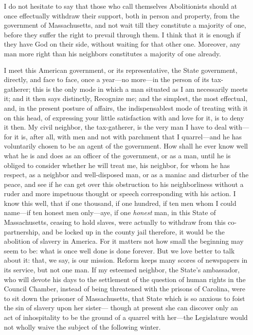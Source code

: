 \documentclass[letterpaper,12pt]{article}
\begin{document}
I do not hesitate to say that those who call themselves Abolitionists should at
once effectually withdraw their support, both in person and property, from the
government of Massachusetts, and not wait till they constitute a majority of
one, before they suffer the right to prevail through them. I think that it is
enough if they have God on their side, without waiting for that other one.
Moreover, any man more right than his neighbors constitutes a majority of one
already.

I meet this American government, or its representative, the State government,
directly, and face to face, once a year---no more---in the person of its
tax-gatherer; this is the only mode in which a man situated as I am necessarily
meets it; and it then says distinctly, Recognize me; and the simplest, the most
effectual, and, in the present posture of affairs, the indispensablest mode of
treating with it on this head, of expressing your little satisfaction with and
love for it, is to deny it then. My civil neighbor, the tax-gatherer, is the
very man I have to deal with---for it is, after all, with men and not with
parchment that I quarrel---and he has voluntarily chosen to be an agent of the
government. How shall he ever know well what he is and does as an officer of the
government, or as a man, until he is obliged to consider whether he will treat
me, his neighbor, for whom he has respect, as a neighbor and well-disposed man,
or as a maniac and disturber of the peace, and see if he can get over this
obstruction to his neighborliness without a ruder and more impetuous thought or
speech corresponding with his action. I know this well, that if one thousand, if
one hundred, if ten men whom I could name---if ten honest men only---aye, if one
\emph{honest} man, in this State of Massachusetts, ceasing to hold slaves, were
actually to withdraw from this co-partnership, and be locked up in the county
jail therefore, it would be the abolition of slavery in America. For it matters
not how small the beginning may seem to be: what is once well done is done
forever. But we love better to talk about it: that, we say, is our mission.
Reform keeps many scores of newspapers in its service, but not one man. If my
esteemed neighbor, the State's ambassador, who will devote his days to the
settlement of the question of human rights in the Council Chamber, instead of
being threatened with the prisons of Carolina, were to sit down the prisoner of
Massachusetts, that State which is so anxious to foist the sin of slavery upon
her sister--- though at present she can discover only an act of inhospitality to
be the ground of a quarrel with her---the Legislature would not wholly waive the
subject of the following winter.
\end{document}
